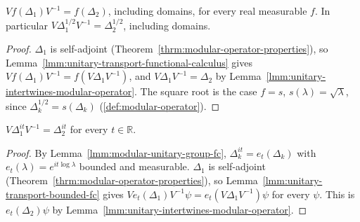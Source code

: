 \begin{lemma}
    \label{lmm:unitary-intertwines-modular-sqrt}
    \leanok
    $Vf(\Delta_1)V^{-1} = f(\Delta_2)$, including domains, for every real measurable $f$. In particular $V\Delta_1^{1/2}V^{-1} = \Delta_2^{1/2}$, including domains.
\end{lemma}
\begin{proof}
    \leanok
    $\Delta_1$ is self-adjoint (Theorem~\ref{thrm:modular-operator-properties}), so Lemma~\ref{lmm:unitary-transport-functional-calculus} gives $Vf(\Delta_1)V^{-1} = f(V\Delta_1V^{-1})$, and $V\Delta_1V^{-1} = \Delta_2$ by Lemma~\ref{lmm:unitary-intertwines-modular-operator}. The square root is the case $f = s$, $s(\lambda) = \sqrt{\lambda}$, since $\Delta_k^{1/2} = s(\Delta_k)$ (\ref{def:modular-operator}).
\end{proof}

\begin{lemma}
    \label{lmm:unitary-intertwines-modular-unitary-group}
    \leanok
    $V\Delta_1^{it}V^{-1} = \Delta_2^{it}$ for every $t \in \mathbb{R}$.
\end{lemma}
\begin{proof}
    \leanok
    By Lemma~\ref{lmm:modular-unitary-group-fc}, $\Delta_k^{it} = e_t(\Delta_k)$ with $e_t(\lambda) = e^{it\log\lambda}$ bounded and measurable. $\Delta_1$ is self-adjoint (Theorem~\ref{thrm:modular-operator-properties}), so Lemma~\ref{lmm:unitary-transport-bounded-fc} gives $Ve_t(\Delta_1)V^{-1}\psi = e_t(V\Delta_1V^{-1})\psi$ for every $\psi$. This is $e_t(\Delta_2)\psi$ by Lemma~\ref{lmm:unitary-intertwines-modular-operator}.
\end{proof}

